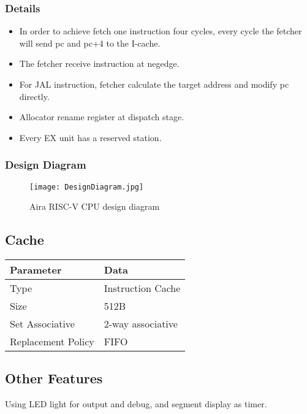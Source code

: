 \documentclass[UTF8]{ctexart}
\begin{document}
    \subsubsection{Details}
    \begin{itemize}
    \item In order to achieve fetch one instruction four cycles, every cycle the fetcher will send pc and pc+4 to the I-cache.
    \item The fetcher receive instruction at negedge.
    \item For JAL instruction, fetcher calculate the target address and modify pc directly.
    \item Allocator rename register at dispatch stage.
    \item Every EX unit has a reserved station.
    \end{itemize}
    \subsubsection{Design Diagram}

    \begin{figure}[h]
    \texttt{[image: DesignDiagram.jpg]}
    \caption{Aira RISC-V CPU design diagram}
    \end{figure}

    \subsection{Cache}
    \begin{center}
        \begin{tabular}{ll}
            \hline
            Parameter & Data\\
            \hline
            Type & Instruction Cache \\
            \hline
            Size & 512B              \\
            \hline
            Set Associative & 2-way associative \\
            \hline
            Replacement Policy & FIFO \\
            \hline
        \end{tabular}
    \end{center}
    \subsection{Other Features}
    Using LED light for output and debug, and segment display as timer.
\end{document}
